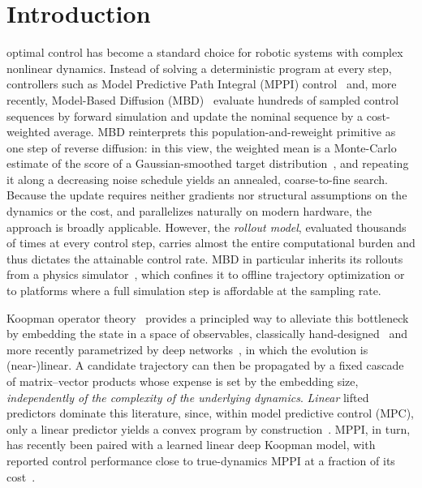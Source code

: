 \documentclass[lettersize,journal]{IEEEtran}
\theoremstyle{remark}
\begin{document}
\section{Introduction}\label{sec:intro}
 optimal control has become a standard
choice for robotic systems with complex nonlinear dynamics. Instead of solving a
deterministic program at every step, controllers such as Model Predictive
Path Integral (MPPI) control~\cite{kappen2005, theodorou2010,
williams2017mppi, williams2016aggressive} and, more recently, Model-Based
Diffusion (MBD)~\cite{pan2024model, xue2025full} evaluate hundreds of
sampled control sequences by forward simulation and update the nominal
sequence by a cost-weighted average.
MBD reinterprets this population-and-reweight primitive as one step of
reverse diffusion: in this view, the weighted mean is a Monte-Carlo
estimate of the score of a Gaussian-smoothed target
distribution~\cite{song2019generative, song2020score}, and repeating it
along a decreasing noise schedule yields an annealed, coarse-to-fine
search. Because the update requires neither gradients nor structural
assumptions on the dynamics or the cost, and parallelizes naturally on
modern hardware, the approach is broadly applicable. However, the
\emph{rollout model}, evaluated thousands of times at every control
step, carries almost the entire computational burden and thus dictates
the attainable control rate. MBD in particular
inherits its rollouts from a physics simulator~\cite{pan2024model}, which
confines it to offline trajectory optimization or to platforms where a
full simulation step is affordable at the sampling rate.

Koopman operator theory~\cite{koopman1931, mezic2005} provides a
principled way to alleviate this bottleneck by embedding the state in a
space of observables, classically hand-designed~\cite{williams2015edmd,
proctor2016dmdc} and more recently parametrized by deep
networks~\cite{lusch2018deep}, in which the evolution is (near-)linear.
A candidate trajectory can then be propagated by a fixed cascade of
matrix--vector products whose expense is set by the embedding size,
\emph{independently of the complexity of the underlying dynamics}.
\emph{Linear} lifted predictors dominate this literature, since, within
model predictive control (MPC), only a linear predictor yields a convex
program by construction~\cite{korda2018mpc, strasser2026}. MPPI, in
turn, has recently been paired with a learned linear deep Koopman
model, with reported control performance close to true-dynamics MPPI at
a fraction of its cost~\cite{mppidk2026}.
\end{document}
